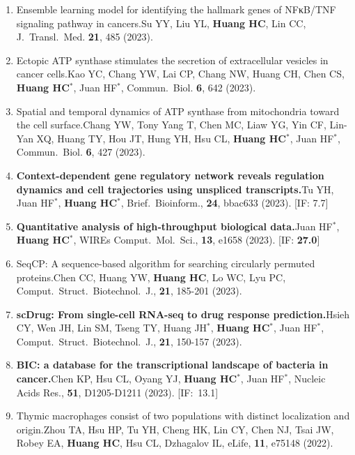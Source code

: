 \documentclass[10pt,a4paper]{article}
\def\mypub#1#2#3{{#1.}\newline #2, #3.}
\def\mybpub#1#2#3{{\boldmath \bf #1.}\newline #2, #3.}
\begin{document}
\begin{enumerate}
\item \mypub{
Ensemble learning model for identifying the hallmark genes of NFκB/TNF signaling pathway in cancers}
{Su YY, Liu YL, {\bf Huang HC}, Lin CC}
{J.\ Transl.\ Med. {\bf 21}, 485 (2023)}

\item \mypub
{Ectopic ATP synthase stimulates the secretion of extracellular vesicles in cancer cells}
{Kao YC, Chang YW, Lai CP, Chang NW, Huang CH, Chen CS, {\bf Huang HC$^*$}, Juan HF$^*$}
{Commun.\ Biol. {\bf 6}, 642 (2023)}

\item \mypub
{Spatial and temporal dynamics of ATP synthase from mitochondria toward the cell surface}
{Chang YW, Tony Yang T, Chen MC, Liaw YG, Yin CF, Lin-Yan XQ, Huang TY, Hou JT, Hung YH, Hsu CL, {\bf Huang HC$^*$}, Juan HF$^*$}
{Commun.\ Biol. {\bf 6}, 427 (2023)}

\item
\mybpub{Context-dependent gene regulatory network reveals regulation dynamics and cell trajectories using unspliced transcripts}
{Tu YH, Juan HF$^*$, {\bf Huang HC$^*$}}
{Brief.\ Bioinform., {\bf 24}, bbac633 (2023)}
[IF: 7.7]

\item
\mybpub{Quantitative analysis of high‐throughput biological data}
{Juan HF$^*$, {\bf Huang HC$^*$}}
{WIREs Comput.\ Mol.\ Sci., {\bf 13}, e1658 (2023)}
[IF: {\bf 27.0}]

\item
\mypub{SeqCP: A sequence-based algorithm for searching circularly permuted proteins}
{Chen CC, Huang YW, {\bf Huang HC}, Lo WC, Lyu PC}
{Comput.\ Struct.\ Biotechnol.\ J., {\bf 21}, 185-201 (2023)}

\item
\mybpub{scDrug: From single-cell RNA-seq to drug response prediction}
{Hsieh CY, Wen JH, Lin SM, Tseng TY, Huang JH$^*$, {\bf Huang HC$^*$}, Juan HF$^*$}
{Comput.\ Struct.\ Biotechnol.\ J., {\bf 21}, 150-157 (2023)}

\item
\mybpub{BIC: a database for the transcriptional landscape of bacteria in cancer}
{Chen KP, Hsu CL, Oyang YJ, {\bf Huang HC$^*$}, Juan HF$^*$}
{Nucleic Acids Res., {\bf 51}, D1205-D1211 (2023)}
[IF:~13.1]

\item
\mypub{Thymic macrophages consist of two populations with distinct localization and origin}
{Zhou TA, Hsu HP, Tu YH, Cheng HK, Lin CY, Chen NJ, Tsai JW, Robey EA, {\bf Huang HC}, Hsu CL,  Dzhagalov IL}
{eLife, {\bf 11}, e75148 (2022)}


\end{enumerate}
\end{document}
